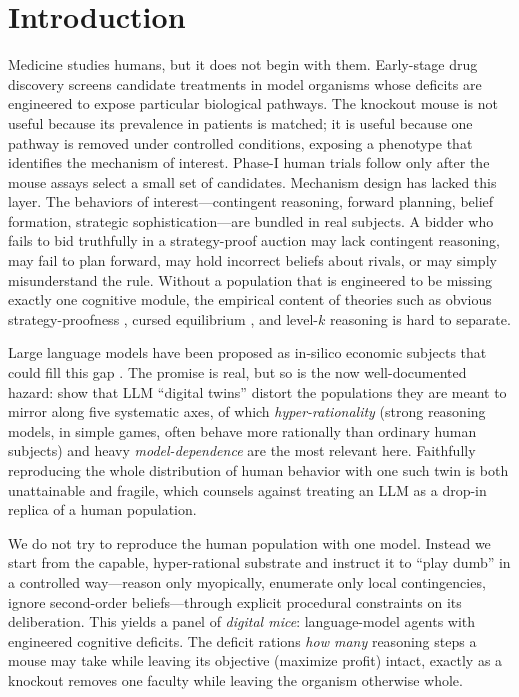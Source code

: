 \documentclass[12pt]{article}
\begin{document}
\section{Introduction}
\label{sec:intro}

Medicine studies humans, but it does not begin with them. Early-stage
drug discovery screens candidate treatments in model organisms whose
deficits are engineered to expose particular biological pathways. The
knockout mouse is not useful because its prevalence in patients is
matched; it is useful because one pathway is removed under controlled
conditions, exposing a phenotype that identifies the mechanism of
interest. Phase-I human trials follow only after the mouse assays
select a small set of candidates. Mechanism design has lacked this
layer. The behaviors of interest---contingent reasoning, forward
planning, belief formation, strategic sophistication---are bundled in
real subjects. A bidder who fails to bid truthfully in a strategy-proof
auction may lack contingent reasoning, may fail to plan forward, may
hold incorrect beliefs about rivals, or may simply misunderstand the
rule. Without a population that is engineered to be missing exactly
one cognitive module, the empirical content of theories such as
obvious strategy-proofness \citep{li2017}, cursed equilibrium
\citep{eysterrabin2005}, and level-$k$ reasoning
\citep{crawfordiriberri2007} is hard to separate.

Large language models have been proposed as in-silico economic
subjects that could fill this gap
\citep{horton2023large,manning2024automated}. The promise is real, but
so is the now well-documented hazard: \citet{peng2025funhouse} show
that LLM ``digital twins'' distort the populations they are meant to
mirror along five systematic axes, of which \emph{hyper-rationality}
(strong reasoning models, in simple games, often behave more rationally
than ordinary human subjects) and heavy \emph{model-dependence} are the
most relevant here. Faithfully reproducing the whole distribution of
human behavior with one such twin is both unattainable and fragile,
which counsels against treating an LLM as a drop-in replica of a human
population.

We do not try to reproduce the human population with one model.
Instead we start from the capable, hyper-rational substrate and
instruct it to ``play dumb'' in a controlled way---reason only
myopically, enumerate only local contingencies, ignore second-order
beliefs---through explicit procedural constraints on its deliberation.
This yields a panel of \emph{digital mice}: language-model agents with
engineered cognitive deficits. The deficit rations \emph{how many}
reasoning steps a mouse may take while leaving its objective (maximize
profit) intact, exactly as a knockout removes one faculty while
leaving the organism otherwise whole.
\end{document}
